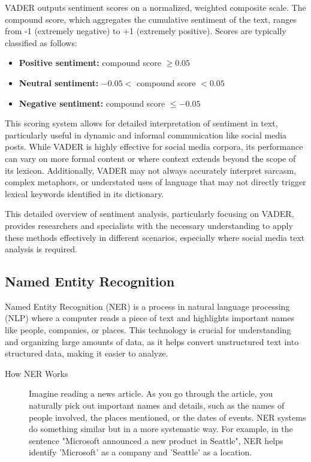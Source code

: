 VADER outputs sentiment scores on a normalized, weighted composite scale. The compound score, which aggregates the cumulative sentiment of the text, ranges from -1 (extremely negative) to +1 (extremely positive). Scores are typically classified as follows:
\begin{itemize}
    \item \textbf{Positive sentiment:} compound score $\geq 0.05$
    \item \textbf{Neutral sentiment:} $-0.05 <$ compound score $< 0.05$
    \item \textbf{Negative sentiment:} compound score $\leq -0.05$
\end{itemize}
This scoring system allows for detailed interpretation of sentiment in text, particularly useful in dynamic and informal communication like social media posts. While VADER is highly effective for social media corpora, its performance can vary on more formal content or where context extends beyond the scope of its lexicon. Additionally, VADER may not always accurately interpret sarcasm, complex metaphors, or understated uses of language that may not directly trigger lexical keywords identified in its dictionary.

This detailed overview of sentiment analysis, particularly focusing on VADER, provides researchers and specialists with the necessary understanding to apply these methods effectively in different scenarios, especially where social media text analysis is required.

\subsection{Named Entity Recognition}
Named Entity Recognition (NER) is a process in natural language processing (NLP) where a computer reads a piece of text and highlights important names like people, companies, or places. This technology is crucial for understanding and organizing large amounts of data, as it helps convert unstructured text into structured data, making it easier to analyze.

\begin{description}
    \item[How NER Works] Imagine reading a news article. As you go through the article, you naturally pick out important names and details, such as the names of people involved, the places mentioned, or the dates of events. NER systems do something similar but in a more systematic way. For example, in the sentence "Microsoft announced a new product in Seattle", NER helps identify 'Microsoft' as a company and 'Seattle' as a location.
\end{description}

